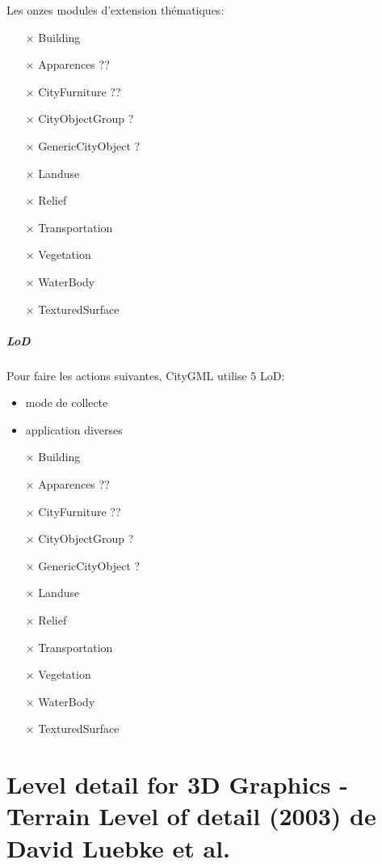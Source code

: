 \documentclass[11pt]{report}
\begin{document}
Les onzes modules d'extension thématiques:
\begin{itemize}
\item [$\times$] Building
\item [$\times$] Apparences ??
\item [$\times$] CityFurniture ??
\item [$\times$] CityObjectGroup ?
\item [$\times$] GenericCityObject ?
\item [$\times$] Landuse
\item [$\times$] Relief
\item [$\times$] Transportation
\item [$\times$] Vegetation
\item [$\times$] WaterBody
\item [$\times$] TexturedSurface
\end{itemize}

\subsubsection{LoD}

Pour faire les actions suivantes, CityGML utilise 5 LoD:
\begin{itemize}
	\item mode de collecte
	\item application diverses
\end{itemize}

\begin{itemize}
\item [$\times$] Building
\item [$\times$] Apparences ??
\item [$\times$] CityFurniture ??
\item [$\times$] CityObjectGroup ?
\item [$\times$] GenericCityObject ?
\item [$\times$] Landuse
\item [$\times$] Relief
\item [$\times$] Transportation
\item [$\times$] Vegetation
\item [$\times$] WaterBody
\item [$\times$] TexturedSurface
\end{itemize}



\part{Level detail for 3D Graphics - Terrain Level of detail (2003) de David Luebke et al.}
\end{document}
